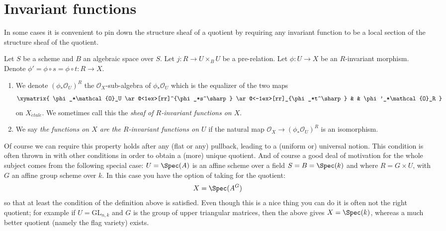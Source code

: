 \section{Invariant functions}
\label{section-functions}

\noindent
In some cases it is convenient to pin down the structure sheaf
of a quotient by requiring any invariant function to be a local
section of the structure sheaf of the quotient.

\begin{definition}
\label{definition-functions}
Let $S$ be a scheme and $B$ an algebraic space over $S$.
Let $j : R \to U \times_B U$ be a pre-relation.
Let $\phi : U \to X$ be an $R$-invariant morphism.
Denote $\phi' = \phi \circ s = \phi \circ t : R \to X$.
\begin{enumerate}
\item We denote $(\phi_*\mathcal{O}_U)^R$ the $\mathcal{O}_X$-sub-algebra
of $\phi_*\mathcal{O}_U$ which is the equalizer of the two maps
$$
\xymatrix{
\phi_*\mathcal{O}_U
\ar@<1ex>[rr]^{\phi_*s^\sharp}
\ar@<-1ex>[rr]_{\phi_*t^\sharp}
& &
\phi'_*\mathcal{O}_R
}
$$
on $X_{\acute{e}tale}$. We sometimes call this the
{\it sheaf of $R$-invariant functions on $X$}.
\item We say {\it the functions on $X$ are the $R$-invariant functions on
$U$} if the natural map $\mathcal{O}_X \to (\phi_*\mathcal{O}_U)^R$
is an isomorphism.
\end{enumerate}
\end{definition}

\noindent
Of course we can require this property holds after any (flat or any) pullback,
leading to a (uniform or) universal notion. This condition is often thrown in
with other conditions in order to obtain a (more) unique quotient. And of
course a good deal of motivation for the whole subject comes from the following
special case: $U = \Spec(A)$ is an affine scheme over a field
$S = B = \Spec(k)$ and where $R = G \times U$, with
$G$ an affine group scheme over $k$. In this case
you have the option of taking for the quotient:
$$
X = \Spec(A^G)
$$
so that at least the condition of the definition above is satisfied.
Even though this is a nice thing you can do it is often not the right
quotient; for example if $U = \text{GL}_{n, k}$ and $G$ is the group of
upper triangular matrices, then the above gives $X = \Spec(k)$, whereas
a much better quotient (namely the flag variety) exists.









